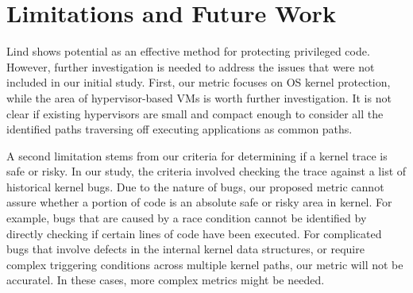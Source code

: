 \section{Limitations and Future Work}
\label{sec.limitation}

Lind shows potential as an effective method for protecting privileged code. However, 
further investigation is needed to address the issues that were not included in our
initial study.
First, our metric 
focuses on OS kernel protection, while the area of hypervisor-based
VMs is worth further investigation.
It is not clear if
existing hypervisors are small and compact enough to consider all the
identified paths traversing off executing applications as common paths.

A second limitation stems from our criteria for determining if a kernel trace is
safe or risky. In our study, the criteria involved checking the trace against a list
of historical kernel bugs.
Due to the nature of bugs, our proposed metric cannot assure whether a portion of code
is an absolute safe or risky area in kernel.
For example, bugs that are caused
by a race condition cannot be identified by directly checking if certain lines of
code have been executed. For complicated bugs that involve defects in the internal
kernel data structures, or require complex triggering conditions across multiple
kernel paths, our metric will not be accuratel. 
In these cases, more complex metrics might be needed.




